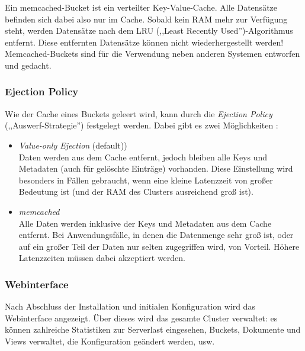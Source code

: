 Ein memcached-Bucket ist ein verteilter Key-Value-Cache. Alle Datensätze befinden sich dabei also nur im Cache. Sobald kein RAM mehr zur Verfügung steht, werden Datensätze nach dem LRU (,,Least Recently Used'')-Algorithmus entfernt. Diese entfernten Datensätze können nicht wiederhergestellt werden! Memcached-Buckets sind für die Verwendung neben anderen Systemen entworfen und gedacht. \cite{couchbase-buckets}

\subsubsection{Ejection Policy}
\label{ejection-policy}
Wie der Cache eines Buckets geleert wird, kann durch die \textit{Ejection Policy} (,,Auswerf-Strategie'') festgelegt werden. Dabei gibt es zwei Möglichkeiten \cite{couchbase-database-engine-architecture}:
\begin{itemize}
	\item \textit{Value-only Ejection} (default))\\
	Daten werden aus dem Cache entfernt, jedoch bleiben alle Keys und Metadaten (auch für gelöschte Einträge) vorhanden. Diese Einstellung wird besonders in Fällen gebraucht, wenn eine kleine Latenzzeit von großer Bedeutung ist (und der RAM des Clusters ausreichend groß ist).
	\item \textit{memcached}\\
	Alle Daten werden inklusive der Keys und Metadaten aus dem Cache entfernt. Bei Anwendungsfälle, in denen die Datenmenge sehr groß ist, oder auf ein großer Teil der Daten nur selten zugegriffen wird, von Vorteil. Höhere Latenzzeiten müssen dabei akzeptiert werden.
\end{itemize}

\subsubsection{Webinterface}
Nach Abschluss der Installation und initialen Konfiguration wird das Webinterface angezeigt. Über dieses wird das gesamte Cluster verwaltet: es können zahlreiche Statistiken zur Serverlast eingesehen, Buckets, Dokumente und Views verwaltet, die Konfiguration geändert werden, usw.

